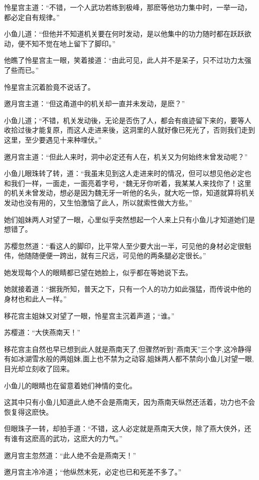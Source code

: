 \documentclass[12pt,oneside]{book}
\begin{document}
怜星宫主道：``不错，一个人武功若练到极峰，那麽等他功力集中时，一举一动，都必定自有规律。''

小鱼儿道：``但他并不知道机关要在何时发动，是以他集中的功力随时都在跃跃欲动，便不知不觉在地上留下了脚印。''

他瞧了怜星宫主一眼，笑着接道：``由此可见，此人并不是呆子，只不过功力太强了些而已。''

怜星宫主沉着脸竟不说话了。

邀月宫主道：``但这甬道中的机关却一直并未发动，是麽？''

小鱼儿道；``不错，机关发动後，无论是否伤了人，都会有痕迹留下来的，要等人收拾过後才能复原，而这人走进来後，这洞里的人就好像已死光了，否则我们走到这里，至少要遇见十来种埋伏。''

邀月宫主道：``但此人来时，洞中必定还有人在，机关又为何始终末曾发动呢？''

小鱼儿眼珠转了转，道：``我虽末见到这人走进来时的情况，但可以想见他必定也和我们一样，一面走，一面亮着字号，``魏无牙你听着，我某某人来找你了！这里的机关未曾发动，想必是因为魏无牙一听他的名头，就大吃一惊，知道就算将机关发动也没有用的，又生怕激恼了此人，所以就索性做大方些。''

她们姐妹两人对望了一眼，心里似乎突然想起一个人来上只有小鱼儿才知道她们是想错了。

苏樱忽然道：``看这人的脚印，比平常人至少要大出一半，可见他的身材必定很魁伟，他随随便便一跨出，就有三尺远，可见他的两条腿必定很长。''

她发现每个人的眼睛都已望在她脸上，似乎都在等她说下去。

她就接着道：``据我所知，普天之下，只有一个人的功力如此强猛，而传说中他的身材也和此人一样。''

移花宫主姐妹又对望了一眼，怜星宫主沉着声道；``谁。''

苏樱道：``大侠燕南天！''

移花宫主自然也早已想到此人就是燕南天了,但骤然听到``燕南天''三个字,这冷静得有如冰湖雪水般的两姐妹,面上也不禁为之动容,姐妹两人都不禁向小鱼儿对望一眼,目光却立刻收了回来。

小鱼儿的眼睛也在留意着她们神情的变化。

这其中只有小鱼儿知道此人绝不会是燕南天，因为燕南天纵然还活着，功力也不会恢复得这麽快。

但眼珠子一转，却拍手道：``不错，这人必定就是燕南天大侠，除了燕大侠外，还有谁有这麽高的武功，这麽大的力气。''

邀月宫主忽然道：``此人绝不会是燕南天！''

邀月宫主冷冷道；``他纵然末死，必定也已和死差不多了。''
\end{document}
